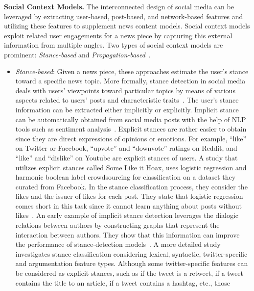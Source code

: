 \textbf{Social Context Models.} The interconnected design of social media can be leveraged by extracting user-based, post-based, and network-based features and utilizing these features to supplement news content models. Social context models exploit related user engagements for a news piece by capturing this external information from multiple angles. Two types of social context models are prominent: \emph{Stance-based} and \emph{Propagation-based}~\parencite{FakeNewsDetectionOnSocialMediaADataMiningPerspective_Shu}.
\begin{itemize}
    \item \emph{Stance-based}: Given a news piece, these approaches estimate the user’s stance toward a specific news topic. More
          formally, stance detection in social media deals with users’ viewpoints toward particular topics by means of various aspects related
          to users’ posts and characteristic traits~\parencite{StanceDetectionOnSocialMeda_Abeer}. The user’s stance information can be
          extracted either implicitly or explicitly. Implicit stance can be automatically obtained from social media posts with the help of NLP
          tools such as sentiment analysis~\parencite{StanceAndSentimentINTweets_Saif}. Explicit stances are rather easier to obtain since they
          are direct expressions of opinions or emotions. For example, “like” on Twitter or Facebook, “upvote” and “downvote” ratings on Reddit,
          and “like” and “dislike” on Youtube are explicit stances of users. A study that utilizes explicit stances called Some Like it
          Hoax, uses logistic regression and harmonic boolean label crowdsourcing for classification on a dataset they curated from Facebook.
          In the stance classification process, they consider the likes and the issuer of likes for each post. They state that logistic regression comes short in this task since it cannot learn anything about posts without likes~\parencite{SomeLikeItHoaxDataset_Tacchini}. An early example of implicit stance detection leverages the dialogic relations between authors
          by constructing graphs that represent the interaction between authors. They show that this information can improve the performance
          of stance-detection models~\parencite{StanceClassificationDialogicProps_Walker}. A more detailed
          study~\parencite{StanceClassificationOnTwitterDebates_Addawood} investigates stance classification considering lexical,
          syntactic, twitter-specific and argumentation feature types. Although some twitter-specific features can be considered as explicit stances, such as if the tweet is a retweet, if a tweet contains the title to an article, if a tweet contains a hashtag, etc., those

\end{itemize}
